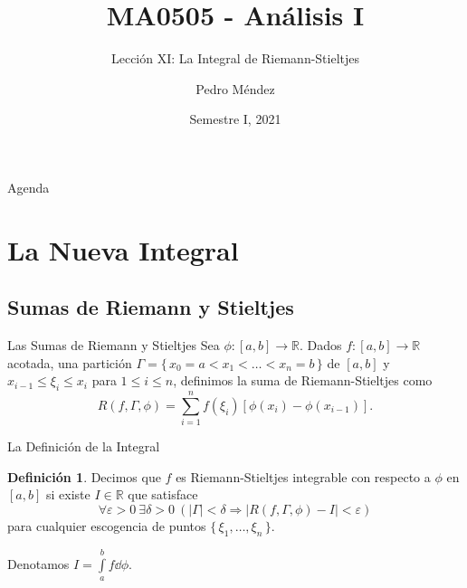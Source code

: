 \documentclass[utf8]{beamer}
\title[MA0505]{MA0505 - An\'alisis I}
\subtitle{Lecci\'on XI: La Integral de Riemann-Stieltjes}
\author{Pedro M\'endez\inst{1}}
\institute[Universidad de Costa Rica] %
{
  \inst{1}%
  Departmento de Matem\'atica Pura y Ciencias Actuariales\\
  Universidad de Costa Rica
  }
\date[I-2021] {Semestre I, 2021}
\theoremstyle{plain}
\theoremstyle{definition}
\newtheorem{Def}{Definición}           %
\theoremstyle{remark}
\numberwithin{equation}{section}
\newcommand{\dl}{\delta}                %
\newcommand{\eps}{\varepsilon}          %
\newcommand{\Ga}{\Gamma}                %
\newcommand{\bR}{\mathbb{R}}    %
\newcommand{\set}[1]{\{\,#1\,\}}    %
\renewcommand{\leq}{\leqslant}          %
\newcommand{\To}{\Rightarrow}
\renewcommand{\.}{\Cdot}                %
\begin{document}
\begin{frame}
  \titlepage
\end{frame}

\begin{frame}{Agenda}
  \tableofcontents
\end{frame}





\section{La Nueva Integral}

\subsection{Sumas de Riemann y Stieltjes}

\begin{frame}{Las Sumas de Riemann y Stieltjes}
  Sea $\phi:[a,b]\to\bR$. Dados $f:[a,b]\to\bR$ acotada, una partición $\Ga=\set{x_0=a<x_1<\dots<x_n=b}$ de $[a,b]$ y $x_{i-1}\leq\xi_i\leq x_i$ para $1\leq i\leq n$, definimos la suma de Riemann-Stieltjes como 
  $$R(f,\Ga,\phi)=\sum_{i=1}^nf(\xi_i)[\phi(x_i)-\phi(x_{i-1})].$$
\end{frame}

\begin{frame}{La Definición de la Integral}
  \begin{Def}\label{def:rsIntegrable}
    Decimos que $f$ es Riemann-Stieltjes integrable con respecto a $\phi$ en $[a,b]$ si existe $I\in\bR$ que satisface
    $$\forall\eps>0\ \exists\dl>0\ (|\Ga|<\dl\To|R(f,\Ga,\phi)-I|<\eps)$$
    para cualquier escogencia de puntos $\set{\xi_1,\dots,\xi_n}$.\par Denotamos $I=\int\limits_a^bf\dd\phi$.
  \end{Def}
\end{frame}
\end{document}
